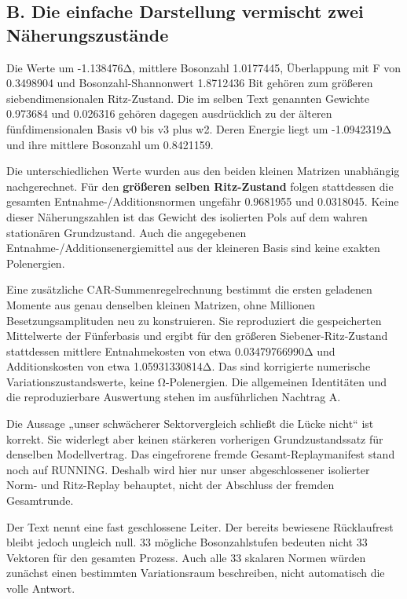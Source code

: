 \subsection{B. Die einfache Darstellung vermischt zwei
Näherungszustände}\label{b.-die-einfache-darstellung-vermischt-zwei-nuxe4herungszustuxe4nde}

Die Werte um -1.138476Δ, mittlere Bosonzahl 1.0177445, Überlappung mit F
von 0.3498904 und Bosonzahl-Shannonwert 1.8712436 Bit gehören zum
größeren siebendimensionalen Ritz-Zustand. Die im selben Text genannten
Gewichte 0.973684 und 0.026316 gehören dagegen ausdrücklich zu der
älteren fünfdimensionalen Basis v0 bis v3 plus w2. Deren Energie liegt
um -1.0942319Δ und ihre mittlere Bosonzahl um 0.8421159.

Die unterschiedlichen Werte wurden aus den beiden kleinen Matrizen
unabhängig nachgerechnet. Für den \textbf{größeren selben Ritz-Zustand}
folgen stattdessen die gesamten Entnahme-/Additionsnormen ungefähr
0.9681955 und 0.0318045. Keine dieser Näherungszahlen ist das Gewicht
des isolierten Pols auf dem wahren stationären Grundzustand. Auch die
angegebenen Entnahme-/Additionsenergiemittel aus der kleineren Basis
sind keine exakten Polenergien.

Eine zusätzliche CAR-Summenregelrechnung bestimmt die ersten geladenen
Momente aus genau denselben kleinen Matrizen, ohne Millionen
Besetzungsamplituden neu zu konstruieren. Sie reproduziert die
gespeicherten Mittelwerte der Fünferbasis und ergibt für den größeren
Siebener-Ritz-Zustand stattdessen mittlere Entnahmekosten von etwa
0.03479766990Δ und Additionskosten von etwa 1.05931330814Δ. Das sind
korrigierte numerische Variationszustandswerte, keine Ω-Polenergien. Die
allgemeinen Identitäten und die reproduzierbare Auswertung stehen im
ausführlichen Nachtrag A.

Die Aussage „unser schwächerer Sektorvergleich schließt die Lücke
nicht`` ist korrekt. Sie widerlegt aber keinen stärkeren vorherigen
Grundzustandssatz für denselben Modellvertrag. Das eingefrorene fremde
Gesamt-Replaymanifest stand noch auf RUNNING. Deshalb wird hier nur
unser abgeschlossener isolierter Norm- und Ritz-Replay behauptet, nicht
der Abschluss der fremden Gesamtrunde.

Der Text nennt eine fast geschlossene Leiter. Der bereits bewiesene
Rücklaufrest bleibt jedoch ungleich null. 33 mögliche Bosonzahlstufen
bedeuten nicht 33 Vektoren für den gesamten Prozess. Auch alle 33
skalaren Normen würden zunächst einen bestimmten Variationsraum
beschreiben, nicht automatisch die volle Antwort.

